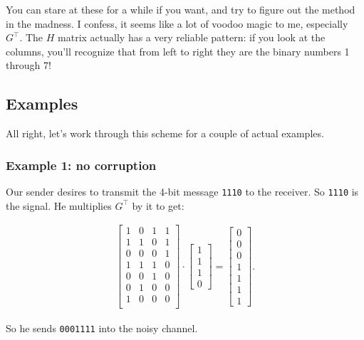 You can stare at these for a while if you want, and try to figure out the
method in the madness. I confess, it seems like a lot of voodoo magic to me,
especially $G^\intercal$. The $H$ matrix actually has a very reliable pattern:
if you look at the columns, you'll recognize that from left to right they are
the binary numbers 1 through 7!

\subsection{Examples}

All right, let's work through this scheme for a couple of actual examples.

\subsubsection{Example 1: no corruption}

Our sender desires to transmit the 4-bit message \texttt{1110} to the receiver.
So \texttt{1110} is the signal. He multiplies $G^\intercal$ by it to get:

\vspace{-.15in}
\begin{align*}
\begin{bmatrix}
1 & 0 & 1 & 1\\
1 & 1 & 0 & 1\\
0 & 0 & 0 & 1\\
1 & 1 & 1 & 0\\
0 & 0 & 1 & 0\\
0 & 1 & 0 & 0\\
1 & 0 & 0 & 0\\
\end{bmatrix} \cdot
\begin{bmatrix}
1 \\ 1 \\ 1 \\ 0
\end{bmatrix} = 
\begin{bmatrix}
0 \\ 0 \\ 0 \\ 1 \\ 1 \\ 1 \\ 1
\end{bmatrix}.
\end{align*}
\vspace{-.15in}

So he sends \texttt{0001111} into the noisy channel.

